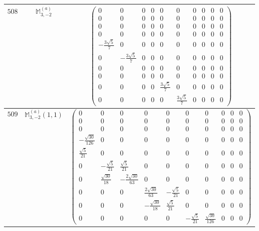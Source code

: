 \documentclass[fleqn,8pt,landscape]{jsarticle}
\begin{document}
\begin{center}
\begin{longtable}{ccc}
$ 508 $ & $ \mathbb{M}_{3,-2}^{(a)} $ & $ \begin{pmatrix} 0 & 0 & 0 & 0 & 0 & 0 & 0 & 0 & 0 & 0 \\ 0 & 0 & 0 & 0 & 0 & 0 & 0 & 0 & 0 & 0 \\ 0 & 0 & 0 & 0 & 0 & 0 & 0 & 0 & 0 & 0 \\ 0 & 0 & 0 & 0 & 0 & 0 & 0 & 0 & 0 & 0 \\ - \frac{3 \sqrt{5}}{7} & 0 & 0 & 0 & 0 & 0 & 0 & 0 & 0 & 0 \\ 0 & - \frac{3 \sqrt{5}}{7} & 0 & 0 & 0 & 0 & 0 & 0 & 0 & 0 \\ 0 & 0 & 0 & 0 & 0 & 0 & 0 & 0 & 0 & 0 \\ 0 & 0 & 0 & 0 & 0 & 0 & 0 & 0 & 0 & 0 \\ 0 & 0 & 0 & 0 & \frac{3 \sqrt{5}}{7} & 0 & 0 & 0 & 0 & 0 \\ 0 & 0 & 0 & 0 & 0 & \frac{3 \sqrt{5}}{7} & 0 & 0 & 0 & 0 \end{pmatrix} $ \\ \hline
$ 509 $ & $ \mathbb{M}_{3,-2}^{(a)}(1,1) $ & $ \begin{pmatrix} 0 & 0 & 0 & 0 & 0 & 0 & 0 & 0 & 0 & 0 \\ 0 & 0 & 0 & 0 & 0 & 0 & 0 & 0 & 0 & 0 \\ 0 & 0 & 0 & 0 & 0 & 0 & 0 & 0 & 0 & 0 \\ - \frac{\sqrt{30}}{126} & 0 & 0 & 0 & 0 & 0 & 0 & 0 & 0 & 0 \\ \frac{\sqrt{5}}{21} & 0 & 0 & 0 & 0 & 0 & 0 & 0 & 0 & 0 \\ 0 & - \frac{\sqrt{5}}{21} & \frac{\sqrt{5}}{21} & 0 & 0 & 0 & 0 & 0 & 0 & 0 \\ 0 & \frac{\sqrt{30}}{18} & - \frac{2 \sqrt{30}}{63} & 0 & 0 & 0 & 0 & 0 & 0 & 0 \\ 0 & 0 & 0 & \frac{2 \sqrt{30}}{63} & - \frac{\sqrt{5}}{21} & 0 & 0 & 0 & 0 & 0 \\ 0 & 0 & 0 & - \frac{\sqrt{30}}{18} & \frac{\sqrt{5}}{21} & 0 & 0 & 0 & 0 & 0 \\ 0 & 0 & 0 & 0 & 0 & - \frac{\sqrt{5}}{21} & \frac{\sqrt{30}}{126} & 0 & 0 & 0 \end{pmatrix} $ \\ \hline

\end{longtable}
\end{center}
\end{document}
